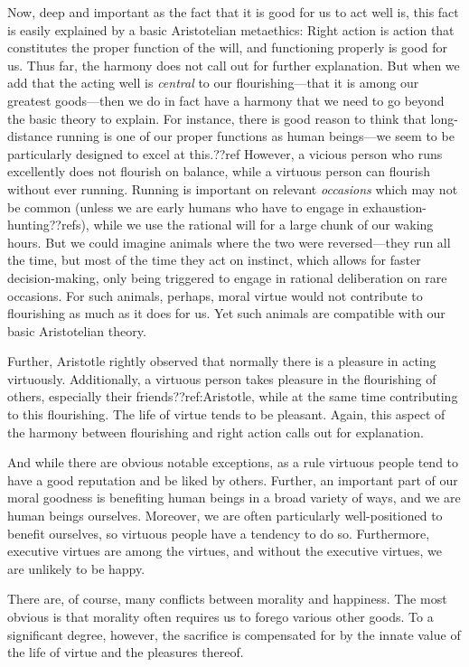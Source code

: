 Now, deep and important as the fact that it is good for us to act well is, this fact is easily explained by
a basic Aristotelian metaethics: Right action is action that constitutes the proper function of the will, and functioning
properly is good for us. Thus far, the harmony does not call out for further explanation. But when we add that
the acting well is \textit{central} to our flourishing---that it is among our greatest goods---then we do in
fact have a harmony that we need to go beyond the basic theory to explain. For instance, there is good reason
to think that long-distance running is one of our proper functions as human beings---we seem to be particularly
designed to excel at this.??ref However, a vicious person who runs excellently does not flourish on balance,
while a virtuous person can flourish without ever running. Running is important on relevant \textit{occasions}
which may not be common (unless we are early humans who have to engage in exhaustion-hunting??refs), while
we use the rational will for a large chunk of our waking hours. But we could imagine animals where the two
were reversed---they run all the time, but most of the time they act on instinct, which allows for faster
decision-making, only being triggered to engage in rational deliberation on rare occasions. For such animals,
perhaps, moral virtue would not contribute to flourishing as much as it does for us. Yet such animals are
compatible with our basic Aristotelian theory.

Further, Aristotle rightly observed that normally there is a pleasure in acting virtuously. Additionally, a virtuous 
person takes pleasure in the flourishing of others, especially their friends??ref:Aristotle, while at the same time 
contributing to this flourishing. The life of virtue tends to be pleasant. Again, this aspect of the harmony
between flourishing and right action calls out for explanation.

And while there are obvious notable exceptions, as a rule virtuous people tend to have a good reputation and be liked
by others. Further, an important part of our moral goodness is benefiting human beings in a broad variety of ways, and we 
are human beings ourselves. Moreover, we are often particularly well-positioned to benefit ourselves, so virtuous people
have a tendency to do so. Furthermore, executive virtues are among the virtues, and without the executive virtues, we are 
unlikely to be happy.

There are, of course, many conflicts between morality and happiness. The most obvious is that morality often requires
us to forego various other goods. To a significant degree, however, the sacrifice is compensated for by the innate value
of the life of virtue and the pleasures thereof. 

